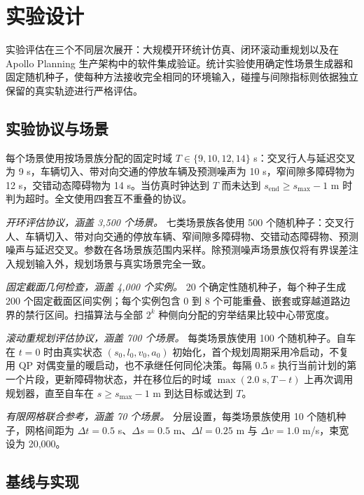 \section{实验设计}
\label{zh:sec:experimental_design}

实验评估在三个不同层次展开：大规模开环统计仿真、闭环滚动重规划以及在 Apollo Planning 生产架构中的软件集成验证。统计实验使用确定性场景生成器和固定随机种子，使每种方法接收完全相同的环境输入，碰撞与间隙指标则依据独立保留的真实轨迹进行严格评估。

\subsection{实验协议与场景}
\label{zh:sec:protocols_scenarios}

每个场景使用按场景族分配的固定时域 $T\in\{9,10,12,14\}$ s：交叉行人与延迟交叉为 9 s，车辆切入、带对向交通的停放车辆及预测噪声为 10 s，窄间隙多障碍物为 12 s，交错动态障碍物为 14 s。当仿真时钟达到 $T$ 而未达到 $s_{\mathrm{end}}\geq s_{\max}-1$ m 时判为超时。全文使用四套互不重叠的协议。

\emph{开环评估协议，涵盖 3{,}500 个场景。} 七类场景族各使用 500 个随机种子：交叉行人、车辆切入、带对向交通的停放车辆、窄间隙多障碍物、交错动态障碍物、预测噪声与延迟交叉。参数在各场景族范围内采样。除预测噪声场景族仅将有界误差注入规划输入外，规划场景与真实场景完全一致。

\emph{固定截面几何检查，涵盖 4{,}000 个实例。} 20 个确定性随机种子，每个种子生成 200 个固定截面区间实例；每个实例包含 0 到 8 个可能重叠、嵌套或穿越道路边界的禁行区间。扫描算法与全部 $2^k$ 种侧向分配的穷举结果比较中心带宽度。

\emph{滚动重规划评估协议，涵盖 700 个场景。} 每类场景族使用 100 个随机种子。自车在 $t=0$ 时由真实状态 $(s_0,l_0,v_0,a_0)$ 初始化，首个规划周期采用冷启动，不复用 QP 对偶变量的暖启动，也不承继任何同伦决策。每隔 0.5 s 执行当前计划的第一个片段，更新障碍物状态，并在移位后的时域 $\max(2.0\text{ s},T-t)$ 上再次调用规划器，直至自车在 $s\geq s_{\max}-1$ m 到达目标或达到 $T$。

\emph{有限网格联合参考，涵盖 70 个场景。} 分层设置，每类场景族使用 10 个随机种子，网格间距为 $\Delta t=0.5$ s、$\Delta s=0.5$ m、$\Delta l=0.25$ m 与 $\Delta v=1.0$ m/s，束宽设为 20{,}000。

\subsection{基线与实现}
\label{zh:sec:baselines_impl}

